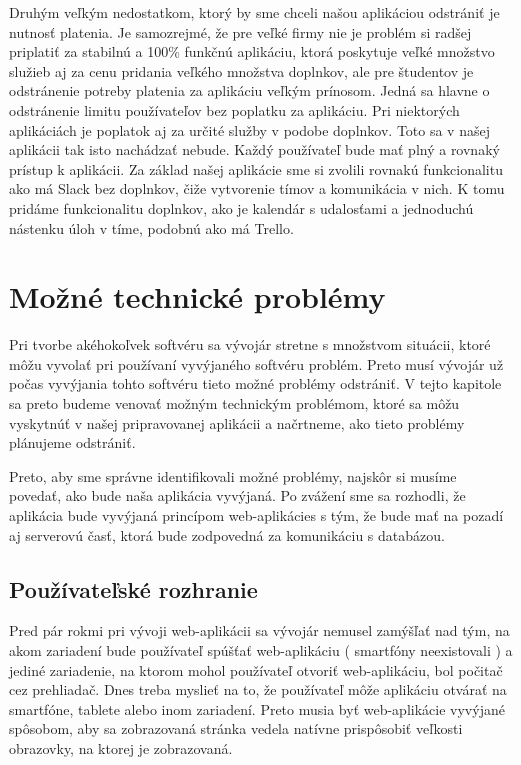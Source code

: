 \indent Druhým veľkým nedostatkom, ktorý by sme chceli našou aplikáciou odstrániť je nutnosť platenia. Je samozrejmé, že pre veľké firmy nie je problém si radšej priplatiť za stabilnú a 100\% funkčnú aplikáciu, ktorá poskytuje veľké množstvo služieb aj za cenu pridania veľkého množstva doplnkov, ale pre študentov je odstránenie potreby platenia za aplikáciu veľkým prínosom. Jedná sa hlavne o odstránenie limitu používateľov bez poplatku za aplikáciu. Pri niektorých aplikáciách je poplatok aj za určité služby v podobe doplnkov. Toto sa v našej aplikácii tak isto nachádzať nebude. Každý používateľ bude mať plný a rovnaký prístup k aplikácii. Za základ našej aplikácie sme si zvolili rovnakú funkcionalitu ako má Slack bez doplnkov, čiže vytvorenie tímov a komunikácia v nich. K tomu pridáme funkcionalitu doplnkov, ako je kalendár s udalosťami a jednoduchú nástenku úloh v tíme, podobnú ako má Trello. 

\section{Možné technické problémy}
\indent Pri tvorbe akéhokoľvek softvéru sa vývojár stretne s množstvom situácii, ktoré môžu vyvolať pri používaní vyvýjaného softvéru problém. Preto musí vývojár už počas vyvýjania tohto softvéru tieto možné problémy odstrániť. V tejto kapitole sa preto budeme venovať možným technickým problémom, ktoré sa môžu vyskytnúť v našej pripravovanej aplikácii a načrtneme, ako tieto problémy plánujeme odstrániť.

\indent Preto, aby sme správne identifikovali možné problémy, najskôr si musíme povedať, ako bude naša aplikácia vyvýjaná. Po zvážení sme sa rozhodli, že aplikácia bude vyvýjaná princípom web-aplikácies s tým, že bude mať na pozadí aj serverovú časť, ktorá bude zodpovedná za komunikáciu s databázou.

\subsection{Používateľské rozhranie}
\indent Pred pár rokmi pri vývoji web-aplikácii sa vývojár nemusel zamýšľať nad tým, na akom zariadení bude používateľ spúšťať web-aplikáciu ( smartfóny neexistovali ) a jediné zariadenie, na ktorom mohol používateľ otvoriť web-aplikáciu, bol počitač cez prehliadač. Dnes treba myslieť na to, že používateľ môže aplikáciu otvárať na smartfóne, tablete alebo inom zariadení. Preto musia byť web-aplikácie vyvýjané spôsobom, aby sa zobrazovaná stránka vedela natívne prispôsobiť veľkosti obrazovky, na ktorej je zobrazovaná.

